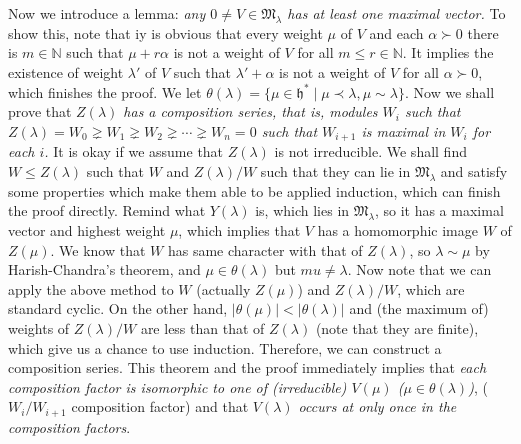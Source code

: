 \documentclass{article}
\newcommand{\NaN}{\mathbb{N}}
\newcommand{\SBar}{\;|\;}
\newcommand{\lie}[1]{\mathfrak{#1}}
\begin{document}
Now we introduce a lemma: \textit{any $0 \ne V \in \mathfrak{M}_\lambda$ has at least one maximal vector.}
To show this, note that iy is obvious that every weight $\mu$ of $V$ and each $\alpha \succ 0$ there is $m \in \NaN$ such that $\mu + r\alpha$ is not a weight of $V$ for all $m \le r \in \NaN$.
It implies the existence of weight $\lambda'$ of $V$ such that $\lambda' + \alpha$ is not a weight of $V$ for all $\alpha \succ 0$, which finishes the proof.
We let $\theta(\lambda) = \{\mu \in \lie{h}^* \SBar \mu \prec \lambda, \mu \sim \lambda\}$.
Now we shall prove that \textit{$Z(\lambda)$ has a composition series, that is, modules $W_i$ such that $Z(\lambda) = W_0 \gneq W_1 \gneq W_2 \gneq \cdots \gneq W_n = 0$ such that $W_{i + 1}$ is maximal in $W_i$ for each $i$.}
It is okay if we assume that $Z(\lambda)$ is not irreducible.
We shall find $W \le Z(\lambda)$ such that $W$ and $Z(\lambda)/W$ such that they can lie in $\mathfrak{M}_\lambda$ and satisfy some properties which make them able to be applied induction, which can finish the proof directly.
Remind what $Y(\lambda)$ is, which lies in $\mathfrak{M}_\lambda$, so it has a maximal vector and highest weight $\mu$, which implies that $V$ has a homomorphic image $W$ of $Z(\mu)$.
We know that $W$ has same character with that of $Z(\lambda)$, so $\lambda \sim \mu$ by Harish-Chandra's theorem, and $\mu \in \theta(\lambda)$ but $mu \ne \lambda$.
Now note that we can apply the above method to $W$ (actually $Z(\mu)$) and $Z(\lambda)/W$, which are standard cyclic.
On the other hand, $|\theta(\mu)| < |\theta(\lambda)|$ and (the maximum of) weights of $Z(\lambda)/W$ are less than that of $Z(\lambda)$ (note that they are finite), which give us a chance to use induction.
Therefore, we can construct a composition series.
This theorem and the proof immediately implies that \textit{each composition factor is isomorphic to one of (irreducible) $V(\mu)$ ($\mu \in \theta(\lambda)$)}, ($W_i / W_{i + 1}$ composition factor) and that \textit{$V(\lambda)$ occurs at only once in the composition factors}.
\end{document}
